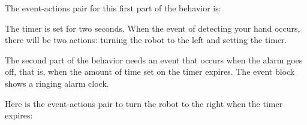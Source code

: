 
\newpage

The event-actions pair for this first part of the behavior is:

The timer is set for two seconds. When the event of detecting your hand
occurs, there will be two actions: turning the robot to the left and
setting the timer.

The second part of the behavior needs an event that occurs when the
alarm goes off, that is, when the amount of time set on the timer
expires. The event block  shows a ringing alarm
clock.

Here is the event-actions pair to turn the robot to the right when the
timer expires: 

\bigskip

